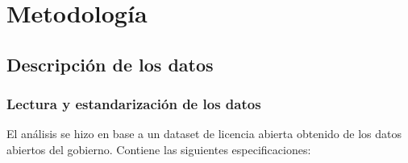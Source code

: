 \newpage
\section{Metodolog\'ia}

\subsection{Descripci\'on de los datos}

\subsubsection{Lectura y estandarizaci\'on de los datos}
El an\'alisis se hizo en base a un dataset de licencia abierta obtenido de los datos abiertos del gobierno.
Contiene las siguientes especificaciones:



